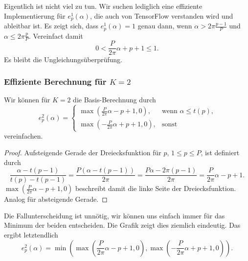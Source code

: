 Eigentlich ist nicht viel zu tun.
Wir suchen lediglich eine effiziente Implementierung für $e_p^1\left(\alpha\right)$, die auch von TensorFlow verstanden wird und ableitbar ist.
Es zeigt sich, dass $e_p^1\left(\alpha\right) = 1$ genau dann, wenn $\alpha > 2\pi\frac{p-1}{P}$ und $\alpha \leq 2\pi\frac{p}{P}$.
Vereinfact damit
\begin{equation}
  0 < \frac{P}{2\pi}\alpha + p + 1 \leq 1.
\end{equation}
Es bleibt die Ungleichungsüberprüfung.

\subsubsection{Effiziente Berechnung für $K=2$}

Wir können für $K=2$ die Basis-Berechnung durch
\begin{equation}
  e_p^2\left(\alpha\right) = \begin{cases}
    \max\left(\frac{P}{2\pi} \alpha - p + 1, 0\right), & \text{wenn }\alpha \leq t\left(p\right)\text{,}\\
    \max\left(-\frac{P}{2\pi} \alpha + p + 1, 0\right), & \text{sonst}
  \end{cases}
\end{equation}
vereinfachen.

\begin{proof}
  Aufsteigende Gerade der Dreiecksfunktion für $p$, $1 \leq p \leq P$, ist definiert durch
  \begin{equation}
    \frac{\alpha - t\left(p-1\right)}{t\left(p\right) - t\left(p-1\right)} = \frac{P\left(\alpha - t\left(p-1\right)\right)}{2\pi} = \frac{P\alpha - 2\pi\left(p-1\right)}{2\pi} = \frac{P}{2\pi}\alpha - p + 1.
  \end{equation}
  $\max \left(\frac{P}{2\pi} \alpha - p + 1, 0\right)$ beschreibt damit die linke Seite der Dreiecksfunktion.
  Analog für absteigende Gerade.
\end{proof}

Die Fallunterscheidung ist unnötig, wir können uns einfach immer für das Minimum der beiden entscheiden.
Die Grafik zeigt dies ziemlich eindeutig.
Das ergibt letztendlich
\begin{equation}
  e_p^2\left(\alpha\right) = \min \left( \max\left(\frac{P}{2\pi} \alpha - p + 1, 0\right), \max\left(-\frac{P}{2\pi} \alpha + p + 1, 0\right) \right)\text{.}
\end{equation}



